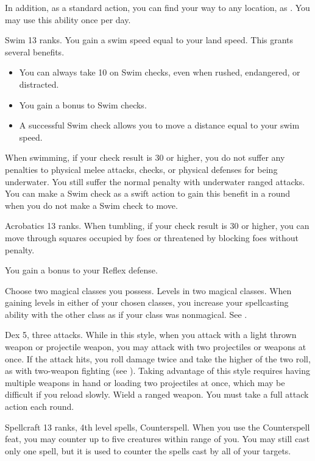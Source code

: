 In addition, as a standard action, you can find your way to any location, as .
You may use this ability once per day.

\featpre Swim 13 ranks.
\featben You gain a swim speed equal to your land speed.
This grants several benefits.
\begin{itemize}
    \item You can always take 10 on Swim checks, even when rushed, endangered, or distracted.
    \item You gain a  bonus to Swim checks.
    \item A successful Swim check allows you to move a distance equal to your swim speed.
\end{itemize}

When swimming, if your check result is 30 or higher, you do not suffer any penalties to physical melee attacks, checks, or physical defenses for being underwater.
You still suffer the normal penalty with underwater ranged attacks.
You can make a Swim check as a swift action to gain this benefit in a round when you do not make a Swim check to move.

\featpre Acrobatics 13 ranks.
\featben When tumbling, if your check result is 30 or higher, you can move through squares occupied by foes or threatened by blocking foes without penalty.

\featben You gain a  bonus to your Reflex defense.

Choose two magical classes you possess.
\featpres
Levels in two magical classes.
\featben When gaining levels in either of your chosen classes, you increase your spellcasting ability with the other class as if your class was nonmagical.
See .

\featpres
Dex 5, three attacks.
\featben While in this style, when you attack with a light thrown weapon or projectile weapon, you may attack with two projectiles or weapons at once.
If the attack hits, you roll damage twice and take the higher of the two roll, as with two-weapon fighting (see ).
Taking advantage of this style requires having multiple weapons in hand or loading two projectiles at once, which may be difficult if you reload slowly.
\stylereq Wield a ranged weapon.
You must take a full attack action each round.

\featpre Spellcraft 13 ranks, 4th level spells, Counterspell.
\featben When you use the Counterspell feat, you may counter up to five creatures within \rngmed range of you.
You may still cast only one spell, but it is used to counter the spells cast by all of your targets.

